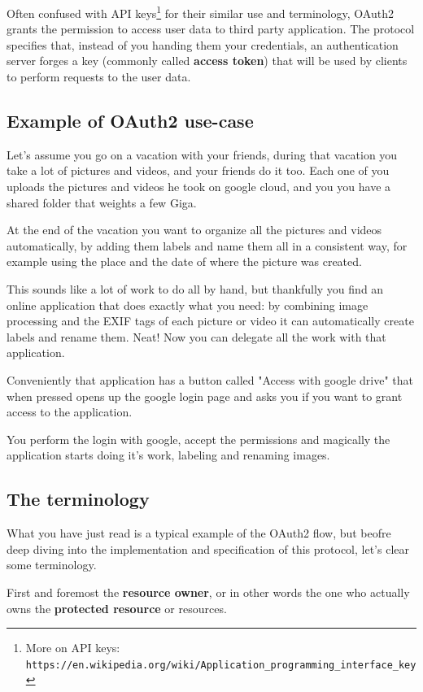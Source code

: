 \documentclass[11pt]{style}
\begin{document}
Often confused with API
keys\footnote{More on API keys:
\texttt{https://en.wikipedia.org/wiki/Application\_programming\_interface\_key}}
for their similar use and terminology, OAuth2 grants the permission to access
user data to third party application.
The protocol specifies that, instead of you handing them your credentials, an
authentication server forges a key (commonly called \textbf{access token}) that
will be used by clients to perform requests to the user data.

\subsection{Example of OAuth2 use-case}

Let's assume you go on a vacation with your friends, during that vacation you
take a lot of pictures and videos, and your friends do it too.
Each one of you uploads the pictures and videos he took on google cloud, and you
you have a shared folder that weights a few Giga.

At the end of the vacation you want to organize all the pictures and videos
automatically, by adding them labels and name them all in a consistent way, for
example using the place and the date of where the picture was created.

This sounds like a lot of work to do all by hand, but thankfully you find an
online application that does exactly what you need: by combining image
processing and the EXIF tags of each picture or video it can automatically
create labels and rename them. Neat! Now you can delegate all the work with that
application.

Conveniently that application has a button called "Access with google drive"
that when pressed opens up the google login page and asks you if you want to
grant access to the application.

You perform the login with google, accept the permissions and magically the
application starts doing it's work, labeling and renaming images.

\subsection{The terminology}
What you have just read is a typical example of the OAuth2 flow, but beofre deep
diving into the implementation and specification of this protocol, let's clear
some terminology.

First and foremost the \textbf{resource owner}, or in other words the one who
actually owns the \textbf{protected resource} or resources.
\end{document}
